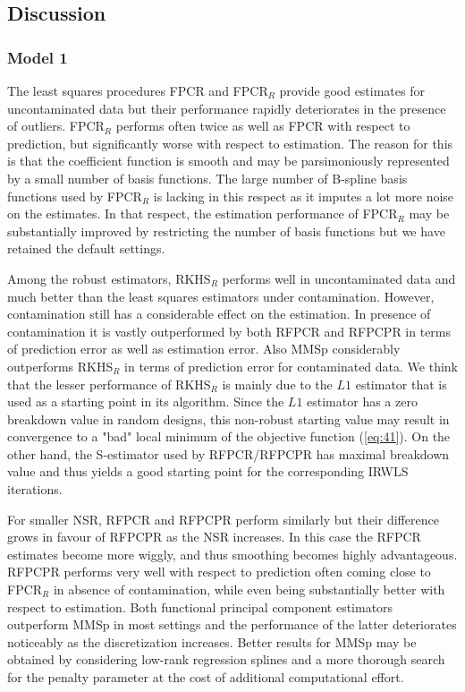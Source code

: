\documentclass[11pt]{article}
\begin{document}
\subsection{Discussion}

\subsubsection{Model 1}

The least squares procedures FPCR and FPCR$_R$ provide good estimates for uncontaminated data but their performance rapidly deteriorates in the presence of outliers.  FPCR$_R$ performs often twice as well as FPCR with respect to prediction, but significantly worse with respect to estimation. The reason for this is that the coefficient function is smooth and may be parsimoniously represented by a small number of basis functions. The large number of B-spline basis functions used by FPCR$_R$ is lacking in this respect as it imputes a lot more noise on the estimates. In that respect, the estimation performance of FPCR$_R$ may be substantially improved by restricting the number of basis functions but we have retained the default settings.

Among the robust estimators, RKHS$_R$ performs well in uncontaminated data and much better than the least squares estimators under contamination. However, contamination still has a considerable effect on the estimation. In presence of contamination it is vastly outperformed by both RFPCR and RFPCPR in terms of prediction error as well as estimation error. Also MMSp considerably outperforms RKHS$_R$ in terms of prediction error for contaminated data. We think that the lesser performance of RKHS$_R$ is mainly due to the $L1$ estimator that is used as a starting point in its algorithm. Since the $L1$ estimator has a zero breakdown value in random designs, this non-robust starting value may result in convergence to a "bad" local minimum of the objective function (\ref{eq:41}). On the other hand, the S-estimator used by RFPCR/RFPCPR has maximal breakdown value and thus yields a good starting point for the corresponding IRWLS iterations.

For smaller NSR, RFPCR and RFPCPR perform similarly but their difference grows in favour of RFPCPR as the NSR increases. In this case the RFPCR estimates become more wiggly, and thus smoothing becomes highly advantageous. RFPCPR performs very well with respect to prediction often coming close to FPCR$_R$ in absence of contamination, while even being substantially better with respect to estimation. Both functional principal component estimators outperform MMSp in most settings and the performance of the latter deteriorates noticeably as the discretization increases. Better results for MMSp may be obtained by considering low-rank regression splines and a more thorough search for the penalty parameter at the cost of additional computational effort.
\end{document}
